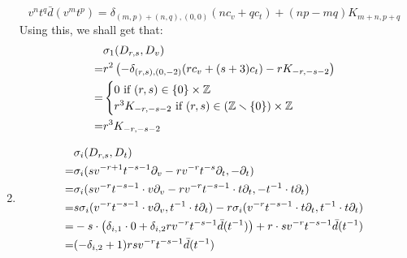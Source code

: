 \begin{example}
\begin{enumerate}
                    $$v^n t^q \bar{d}(v^m t^p) = \delta_{(m, p) + (n, q), (0, 0)} ( n c_v + q c_t ) + (np - mq) K_{m + n, p + q}$$
                Using this, we shall get that:
                    $$
                        \begin{aligned}
                            & \sigma_1(D_{r, s}, D_v)
                            \\
                            = & r^2 \left( -\delta_{(r, s), (0, -2)} ( r c_v + (s + 3) c_t ) - r K_{-r, -s - 2} \right)
                            \\
                            = &
                            \begin{cases}
                                \text{$0$ if $(r, s) \in \{0\} \x \Z$}
                                \\
                                \text{$r^3 K_{-r, -s - 2}$ if $(r, s) \in (\Z \setminus \{0\}) \x \Z$}
                            \end{cases}
                            \\
                            = & r^3 K_{-r, -s - 2}
                        \end{aligned}
                    $$
                \item
                    $$
                        \begin{aligned}
                            & \sigma_i(D_{r, s}, D_t)
                            \\
                            = & \sigma_i( s v^{-r + 1} t^{-s - 1} \partial_v - r v^{-r} t^{-s} \partial_t, -\partial_t )
                            \\
                            = & \sigma_i( s v^{-r} t^{-s - 1} \cdot v \partial_v - r v^{-r} t^{-s - 1} \cdot t \partial_t, -t^{-1} \cdot t\partial_t )
                            \\
                            = & s \sigma_i( v^{-r} t^{-s - 1} \cdot v \partial_v, t^{-1} \cdot t\partial_t ) - r\sigma_i( v^{-r} t^{-s- 1} \cdot t \partial_t, t^{-1} \cdot t\partial_t )
                            \\
                            = & -s \cdot \left( \delta_{i, 1} \cdot 0 + \delta_{i, 2} r v^{-r} t^{-s - 1} \bar{d}(t^{-1}) \right) + r \cdot s v^{-r} t^{-s - 1} \bar{d}(t^{-1})
                            \\
                            = & (-\delta_{i, 2} + 1) rs v^{-r} t^{-s - 1} \bar{d}(t^{-1})
                        \end{aligned}
                    $$

\end{enumerate}
\end{example}
